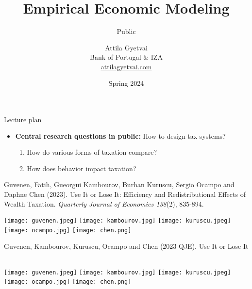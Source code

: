 \documentclass[aspectratio=169,compress,t,xcolor=table]{beamer}
\title[]{Empirical Economic Modeling}
\subtitle{Public}
\author[]{%
  \texorpdfstring{%
    Attila Gyetvai \\ \vspace*{0.5em} \footnotesize Bank of Portugal \& IZA \\ \href{https://attilagyetvai.com}{\color{MyStructure}\ul{attilagyetvai.com}}
  }{Gyetvai}
}
\date[]{\footnotesize Spring 2024}
\begin{document}
{
\begin{frame}
  \titlepage
\end{frame}
}
\addtocounter{framenumber}{-1}

\begin{frame}{Lecture plan}
  \begin{itemize}
    \vfill\item {\color{MyStructure}\textbf{Central research questions in public:}} How to design tax systems?
    \begin{enumerate}
      \addtolength{\baselineskip}{1em}
      \item How do various forms of taxation compare?
      \item How does behavior impact taxation?
    \end{enumerate}
  \end{itemize}
\end{frame}

\begin{frame}{}
Guvenen, Fatih, Gueorgui Kambourov, Burhan Kuruscu, Sergio Ocampo and Daphne Chen (2023). Use It or Lose It: Efficiency and Redistributional Effects of Wealth Taxation. \textit{Quarterly Journal of Economics 138}(2), 835-894.
  \begin{center}
    \texttt{[image: guvenen.jpeg]} \hspace*{1em}
    \texttt{[image: kambourov.jpg]} \hspace*{1em}
    \texttt{[image: kuruscu.jpeg]} \hspace*{1em}
    \texttt{[image: ocampo.jpg]} \hspace*{1em}
    \texttt{[image: chen.png]}
  \end{center}
\end{frame}
\addtocounter{framenumber}{-1}

\begin{frame}{}
Guvenen, Kambourov, Kuruscu, Ocampo and Chen (2023 QJE). Use It or Lose It \\ \phantom{(Efficiency)} \\ \phantom{Journal of you,}
  \begin{center}
    \texttt{[image: guvenen.jpeg]} \hspace*{1em}
    \texttt{[image: kambourov.jpg]} \hspace*{1em}
    \texttt{[image: kuruscu.jpeg]} \hspace*{1em}
    \texttt{[image: ocampo.jpg]} \hspace*{1em}
    \texttt{[image: chen.png]}
  \end{center}
\end{frame}
\addtocounter{framenumber}{-1}
\end{document}
